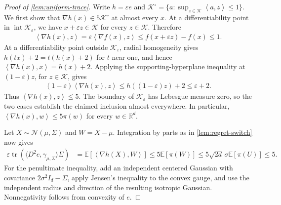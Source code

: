 \documentclass{article}
\newcommand{\R}{\mathbb R}
\newcommand{\E}{\mathbb E}
\newcommand{\K}{\mathcal K}
\newcommand{\N}{\mathcal N}
\newcommand{\tr}{\operatorname{tr}}
\newcommand{\1}{\mathbf 1}
\newcommand{\eps}{\varepsilon}
\newcommand{\ip}[2]{\left\langle #1,#2\right\rangle}
\begin{document}
\begin{proof}[Proof of \cref{lem:uniform-trace}]
    Write $h=\eps e$ and
    $\K^\circ=\{a:\sup_{z\in\K}\ip{a}{z}\leq1\}$.
    We first show that $\nabla h(x)\in5\K^\circ$ at almost every $x$.
    At a differentiability point in $\operatorname{int}\K_\eps$, we have
    $x+\eps z\in\K$ for every $z\in\K$. Therefore
    \begin{align}
        \ip{\nabla h(x)}{z}
        =\eps\ip{\nabla f(x)}{z}
        \leq f(x+\eps z)-f(x)\leq1.
    \end{align}
    At a differentiability point outside $\K_\eps$, radial homogeneity
    gives $h(tx)+2=t(h(x)+2)$ for $t$ near one, and hence
    $\ip{\nabla h(x)}{x}=h(x)+2$. Applying the supporting-hyperplane
    inequality at $(1-\eps)z$, for $z\in\K$, gives
    \begin{align}
        (1-\eps)\ip{\nabla h(x)}{z}
        \leq h((1-\eps)z)+2\leq\eps+2.
    \end{align}
    Thus $\ip{\nabla h(x)}{z}\leq5$. The boundary of $\K_\eps$ has
    Lebesgue measure zero, so the two cases establish the claimed
    inclusion almost everywhere. In particular,
    $\ip{\nabla h(x)}{w}\leq5\pi(w)$ for every $w\in\R^d$.

    Let $X\sim\N(\mu,\Sigma)$ and $W=X-\mu$. Integration by parts as
    in \cref{lem:regret-switch} now gives
    \begin{align}
        \eps\tr\left(\langle D^2e,\gamma_{\mu,\Sigma}\rangle\Sigma\right)
         & =\E\left[\ip{\nabla h(X)}{W}\right]
        \leq5\E[\pi(W)]
        \leq5\sqrt{2d}\,\sigma\E[\pi(U)]
        \leq5.
    \end{align}
    For the penultimate inequality, add an independent centered Gaussian
    with covariance $2\sigma^2I_d-\Sigma$, apply Jensen's inequality to
    the convex gauge, and use the independent radius and direction of
    the resulting isotropic Gaussian. Nonnegativity follows from
    convexity of $e$.
\end{proof}
\end{document}
